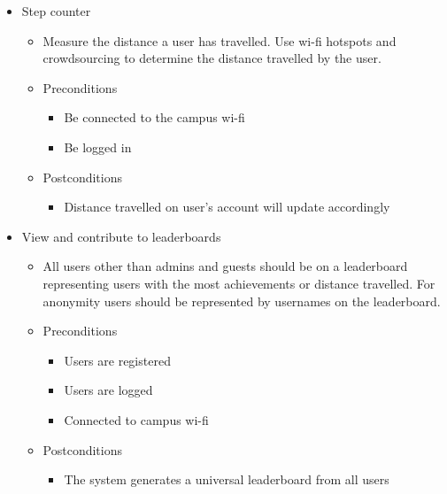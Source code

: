 \documentclass[12pt]{article}
\begin{document}
\begin{enumerate}
\begin{itemize}
				\item Step counter
				\begin{itemize}
					\item Measure the distance a user has travelled. Use wi-fi hotspots and crowdsourcing to determine the distance travelled by the user.
					\item Preconditions
					\begin{itemize}
						\item Be connected to the campus wi-fi
						\item Be logged in
					\end{itemize}
					\item Postconditions
					\begin{itemize}
						\item Distance travelled on user’s account will update accordingly
					\end{itemize}
				\end{itemize}
				
				\item View and contribute to leaderboards
				\begin{itemize}
					\item All users other than admins and guests should be on a leaderboard representing users with the most achievements or distance travelled. For anonymity users should be represented by usernames on the leaderboard.
					\item Preconditions
					\begin{itemize}
						\item Users are registered
						\item Users are logged
						\item Connected to campus wi-fi
					\end{itemize}
					\item Postconditions
					\begin{itemize}
						\item The system generates a universal leaderboard from all users
					\end{itemize}
				\end{itemize}
				
			\end{itemize}
			

\end{enumerate}
\end{document}
